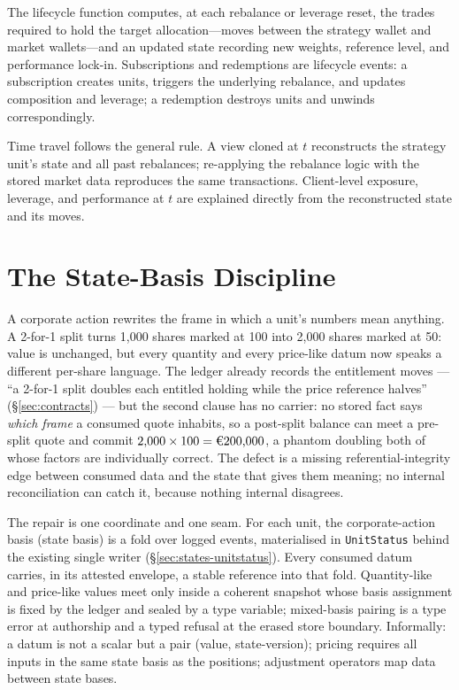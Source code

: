 \documentclass[11pt,a4paper]{article}
\newcommand{\EUR}[1]{\mbox{\texteuro#1}}
\begin{document}
The lifecycle function computes, at each rebalance or leverage reset, the trades required to hold the target allocation---moves between the strategy wallet and market wallets---and an updated state recording new weights, reference level, and performance lock-in. Subscriptions and redemptions are lifecycle events: a subscription creates units, triggers the underlying rebalance, and updates composition and leverage; a redemption destroys units and unwinds correspondingly.

Time travel follows the general rule. A view cloned at $t$ reconstructs the strategy unit's state and all past rebalances; re-applying the rebalance logic with the stored market data reproduces the same transactions. Client-level exposure, leverage, and performance at $t$ are explained directly from the reconstructed state and its moves.

\section{The State-Basis Discipline}
\label{sec:basis}
\label{sec:state-basis}

A corporate action rewrites the frame in which a unit's numbers mean anything. A 2-for-1
split turns 1{,}000 shares marked at 100 into 2{,}000 shares marked at 50: value is
unchanged, but every quantity and every price-like datum now speaks a different per-share
language. The ledger already records the entitlement moves --- ``a 2-for-1 split doubles
each entitled holding while the price reference halves'' (\S\ref{sec:contracts}) --- but
the second clause has no carrier: no stored fact says \emph{which frame} a consumed quote
inhabits, so a post-split balance can meet a pre-split quote and commit
$2{,}000\times100=\EUR{200{,}000}$, a phantom doubling both of whose factors are
individually correct. The defect is a missing referential-integrity edge between consumed
data and the state that gives them meaning; no internal reconciliation can catch it,
because nothing internal disagrees.

The repair is one coordinate and one seam. For each unit, the corporate-action basis
(state basis) is a fold over logged events, materialised in \texttt{UnitStatus} behind
the existing single writer (\S\ref{sec:states-unitstatus}). Every consumed datum carries, in its attested
envelope, a stable reference into that fold. Quantity-like and price-like values meet
only inside a coherent snapshot whose basis assignment is fixed by the ledger and sealed
by a type variable; mixed-basis pairing is a type error at authorship and a typed refusal
at the erased store boundary. Informally: a datum is not a scalar but a pair (value,
state-version); pricing requires all inputs in the same state basis as the positions;
adjustment operators map data between state bases.
\end{document}
